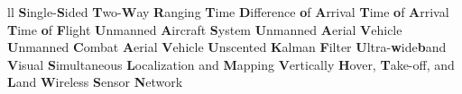 \begin{abbreviations}{ll}
    		{\textbf{S}ingle-\textbf{S}ided \textbf{T}wo-\textbf{W}ay \textbf{R}anging}
    		{\textbf{T}ime \textbf{D}ifference \textbf{o}f \textbf{A}rrival}
    		{\textbf{T}ime \textbf{o}f \textbf{A}rrival}
    		{\textbf{T}ime \textbf{o}f \textbf{F}light}
    		{\textbf{U}nmanned \textbf{A}ircraft \textbf{S}ystem}
    		{\textbf{U}nmanned \textbf{A}erial \textbf{V}ehicle}
    		{\textbf{U}nmanned \textbf{C}ombat \textbf{A}erial \textbf{V}ehicle}
    		{\textbf{U}nscented \textbf{K}alman \textbf{F}ilter}
    		{\textbf{U}ltra-\textbf{w}ide\textbf{b}and}
    		{\textbf{V}isual \textbf{S}imultaneous \textbf{L}ocalization and \textbf{M}apping}
    		{\textbf{V}ertically \textbf{H}over, \textbf{T}ake-off, and \textbf{L}and}
    		{\textbf{W}ireless \textbf{S}ensor \textbf{N}etwork}
\end{abbreviations}
